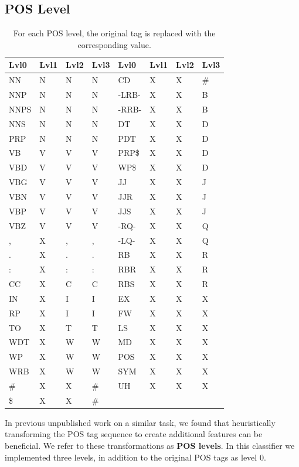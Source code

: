 \documentclass[11pt]{article}
\begin{document}
\subsection{POS Level}
\label{sec-4-2}

\begin{table}[tbp]
\centering
\scriptsize

\begin{tabular}{llllllll}
Lvl0 & Lvl1 & Lvl2 & Lvl3 & Lvl0 & Lvl1 & Lvl2 & Lvl3\\
\hline
NN & N & N & N & CD & X & X & \#\\
NNP & N & N & N & -LRB- & X & X & B\\
NNPS & N & N & N & -RRB- & X & X & B\\
NNS & N & N & N & DT & X & X & D\\
PRP & N & N & N & PDT & X & X & D\\
VB & V & V & V & PRP\$ & X & X & D\\
VBD & V & V & V & WP\$ & X & X & D\\
VBG & V & V & V & JJ & X & X & J\\
VBN & V & V & V & JJR & X & X & J\\
VBP & V & V & V & JJS & X & X & J\\
VBZ & V & V & V & -RQ- & X & X & Q\\
, & X & , & , & -LQ- & X & X & Q\\
. & X & . & . & RB & X & X & R\\
: & X & : & : & RBR & X & X & R\\
CC & X & C & C & RBS & X & X & R\\
IN & X & I & I & EX & X & X & X\\
RP & X & I & I & FW & X & X & X\\
TO & X & T & T & LS & X & X & X\\
WDT & X & W & W & MD & X & X & X\\
WP & X & W & W & POS & X & X & X\\
WRB & X & W & W & SYM & X & X & X\\
\# & X & X & \# & UH & X & X & X\\
\$ & X & X & \# &  &  &  & \\
\end{tabular}

\caption{For each POS level, the original tag is replaced with the corresponding value.}
\label{tbl:pos-level}
\end{table}

In previous unpublished work on a similar task, we found that
heuristically transforming the POS tag sequence to create additional
features can be beneficial. We refer to these transformations as \textbf{POS
levels}. In this classifier we implemented three levels, in addition
to the original POS tags as level 0.
\end{document}
